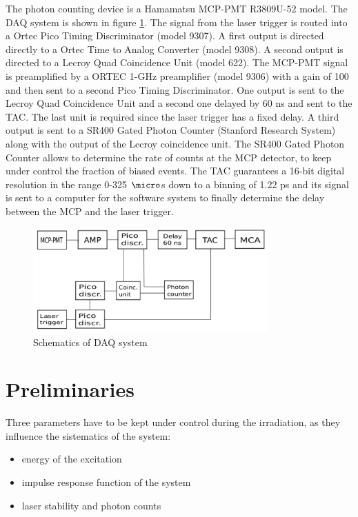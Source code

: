 The photon counting device is a Hamamatsu MCP-PMT R3809U-52 model. The DAQ system is shown in figure \ref{fig:daq}.
The signal from the laser trigger is routed into a Ortec Pico Timing Discriminator (model 9307). A first output is directed directly to a Ortec Time to Analog Converter (model 9308).
A second output is directed to a Lecroy Quad Coincidence Unit (model 622).
The MCP-PMT signal is preamplified by a ORTEC 1-GHz preamplifier (model 9306) with a gain of 100 and then sent to a second Pico Timing Discriminator. One output is sent to the Lecroy Quad Coincidence Unit and a second one delayed by 60 ns and sent to the TAC. The last unit is required since the laser trigger has a fixed delay. 
A third output is sent to a SR400 Gated Photon Counter (Stanford Research System) along with the output of the Lecroy coincidence unit.
The SR400 Gated Photon Counter allows to determine the rate of counts at the MCP detector, to keep under control the fraction of biased events.
The TAC guarantees a 16-bit digital resolution in the range 0-325 $\micro$s down to a binning of 1.22 ps and its signal is sent to a computer for the software system to finally determine the delay between the MCP and the laser trigger.
\begin{figure}[htbp]
\begin{center}
\includegraphics[width=9cm]{../Pictures/Chapter_7/electronics.pdf}
\end{center}
\caption[VUV DAQ]{Schematics of DAQ system}
\label{fig:daq}
\end{figure}

\section{Preliminaries}
Three parameters have to be kept under control during the irradiation, as they influence the sistematics of the system:
\begin{itemize}
\item energy of the excitation
\item impulse response function of the system
\item laser stability and photon counts
\end{itemize}

